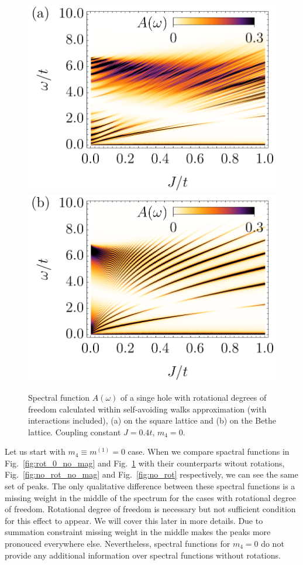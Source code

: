 \documentclass[%
 reprint,
 amsmath,amssymb,
 aps,
prb,
floatfix,
]{revtex4-1}
\begin{document}
\begin{figure}[ht!]
	\includegraphics[width=0.49\columnwidth]
	{./figures/square/[0].png}
	\includegraphics[width=0.49\columnwidth]
	{./figures/bethe/[0].png}
	\caption{
		Spectral function $A(\omega)$ of a singe hole with rotational degrees of freedom calculated within self-avoiding walks approximation (with interactions included), (a) on the square lattice and (b) on the Bethe lattice. Coupling constant $J=0.4t$, $m_4 = 0$.
	}\label{fig:rot_0}
\end{figure}

Let us start with $m_4 \equiv m^{(1)} = 0$ case. When we compare spactral functions in Fig.~\ref{fig:rot_0_no_mag} and Fig.~\ref{fig:rot_0} with their counterparts witout rotations, Fig.~\ref{fig:no_rot_no_mag} and Fig.~\ref{fig:no_rot} respectively, we can see the same set of peaks. The only qualitative difference between these spectral functions is a missing weight in the middle of the spectrum for the cases with rotational degree of freedom. Rotational degree of freedom is necessary but not sufficient condition for this effect to appear. We will cover this later in more details. Due to summation constraint missing weight in the middle makes the peaks more pronouced everywhere else. Nevertheless, spectral functions for $m_4 = 0$ do not provide any additional information over spectral functions without rotations.
\end{document}
